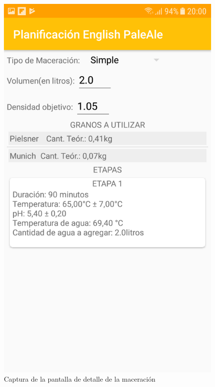              \begin{figure}[h]
                    \centering
                    \includegraphics[scale=0.2]{software/ScreenCapture/MashDetailActvity.jpg}
                    \caption{Captura de la pantalla de detalle de la maceración}
                    \label{fig:CapturaDetMashAct}
                \end{figure}
